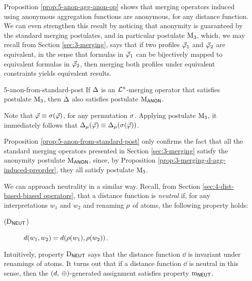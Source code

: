 Proposition \ref{prop:5-anon-agg-anon-op} shows that merging operators induced 
using anonymous aggregation functions are anonymous, for any distance function.
We can even strengthen this result
by noticing that anonymity is guaranteed by the standard 
merging postulates, and in particular postulate $\ppm{3}$,
which, we may recall from Section \ref{sec:3-merging},
says that if two profiles $\P_1$ and $\P_2$ are equivalent, 
in the sense that formulas in $\P_1$ can be bijectively mapped
to equivalent formulas in $\P_2$, then merging both profiles 
under equivalent constraints yields equivalent results.

\begin{prp}{}{5-anon-from-standard-post}
	If $\me$ is an $\L^{n}$-merging operator that satisfies postulate $\ppm{3}$,
	then $\me$ also satisfies postulate $\ppm{\ANON}$.
\end{prp}
\begin{prf*}{}{}%
	Note that $\P\equiv\perm(\P)$, for any permutation $\perm$.
	Applying postulate $\ppm{3}$, it immediately follows that $\me_\mu(\P)\equiv \me_\mu(\perm(\P))$.
\end{prf*}

Proposition \ref{prop:5-anon-from-standard-post} only confirms 
the fact that all the standard merging operators 
presented in Section \ref{sec:3-merging} satisfy the anonymity postulate $\ppm{\ANON}$, 
since, by Proposition \ref{prop:3-merging-d-agg-induced-preorder}, 
they all satisfy postulate $\ppm{3}$.

We can approach neutrality in a similar way.
Recall, from Section \ref{sec:4-dist-based-biased operators}, 
that a distance function is \emph{neutral} 
if, for any interpretations $w_1$ and $w_2$ and renaming $\rnm$ of atoms,
the following property holds:

\begin{description}
	\item[($\ood{\NEUT}$)] $\dd(w_1, w_2) = \dd(\rnm(w_1), \rnm(w_2))$.
\end{description}

Intuitively, property $\ood{\NEUT}$ says that the distance function $\dd$
is invariant under renamings of atoms. 
It turns out that if a distance function $\dd$ is neutral in this sense,
then the $(\dd,\:\agg)$-generated assignment satisfies property $\oom{\NEUT}$.

